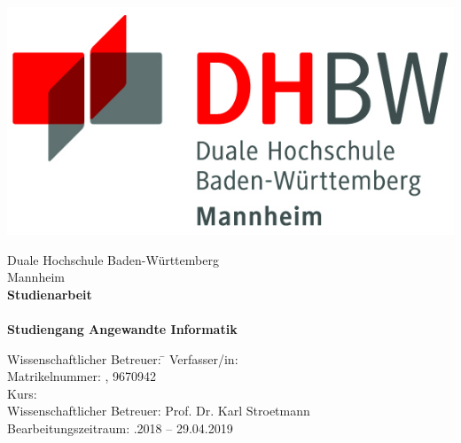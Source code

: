 \begin{titlepage}
\begin{minipage}{\textwidth}
		\vspace{-2cm}
		\noindent \begin{center}
		\includegraphics{Bilder/logo.jpg}
	\end{center}		 
\end{minipage}
\vspace{1em}
\sffamily
\begin{center}
	\textsf{\large{}Duale Hochschule Baden-W\"urttemberg\\[1.5mm] Mannheim}\\[2em]
	\textsf{\textbf{\large{}Studienarbeit}}\\[3mm]
	\textsf{\textbf{\Large{}\DerTitelDerArbeit}} \\[1.5cm]
	\textsf{\textbf{\large{}Studiengang Angewandte Informatik}}%
	
\vfill

\begin{minipage}{\textwidth}

\begin{tabbing}
	Wissenschaftlicher Betreuer: \hspace{0.85cm}\=\kill
	Verfasser/in: \> \DerAutorDerArbeit \\[1.5mm]
	Matrikelnummer: , 9670942 \\[1.5mm]
	Kurs: \> \DieKursbezeichnung \\[1.5mm]
	Wissenschaftlicher Betreuer: \> Prof. Dr. Karl Stroetmann  \\
	Bearbeitungszeitraum: .2018 -- 29.04.2019
\end{tabbing}
\end{minipage}

\end{center}

\end{titlepage}